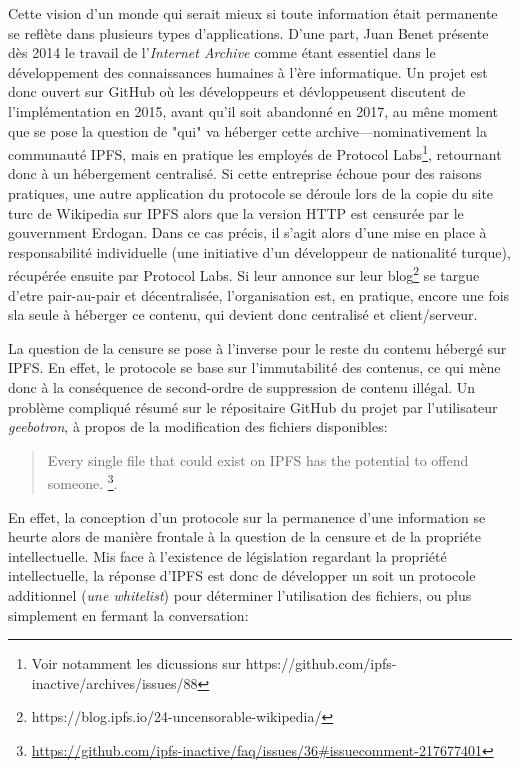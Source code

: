 \documentclass{article}
\begin{document}
Cette vision d'un monde qui serait mieux si toute information était permanente se reflète dans plusieurs types d'applications. D'une part, Juan Benet présente dès 2014 le travail de l'\emph{Internet Archive} comme étant essentiel dans le développement des connaissances humaines à l'ère informatique. Un projet est donc ouvert sur GitHub où les développeurs et dévloppeusent discutent de l'implémentation en 2015, avant qu'il soit abandonné en 2017, au mêne moment que se pose la question de "qui" va héberger cette archive—nominativement la communauté IPFS, mais en pratique les employés de Protocol Labs\footnote{Voir notamment les dicussions sur https://github.com/ipfs-inactive/archives/issues/88}, retournant donc à un hébergement centralisé. Si cette entreprise échoue pour des raisons pratiques, une autre application du protocole se déroule lors de la copie du site turc de Wikipedia sur IPFS alors que la version HTTP est censurée par le gouvernment Erdogan. Dans ce cas précis, il s'agit alors d'une mise en place à responsabilité individuelle (une initiative d'un développeur de nationalité turque), récupérée ensuite par Protocol Labs. Si leur annonce sur leur blog\footnote{https://blog.ipfs.io/24-uncensorable-wikipedia/} se targue d'etre pair-au-pair et décentralisée, l'organisation est, en pratique,  encore une fois sla seule à héberger ce contenu, qui devient donc centralisé et client/serveur.

La question de la censure se pose à l'inverse pour le reste du contenu hébergé sur IPFS. En effet, le protocole se base sur l'immutabilité des contenus, ce qui mène donc à la conséquence de second-ordre de suppression de contenu illégal. Un problème compliqué résumé sur le répositaire GitHub du projet par l'utilisateur \emph{geebotron}, à propos de la modification des fichiers disponibles:

\begin{quote}
    Every single file that could exist on IPFS has the potential to offend someone. \footnote{\url{https://github.com/ipfs-inactive/faq/issues/36\#issuecomment-217677401}}.
\end{quote}

En effet, la conception d'un protocole sur la permanence d'une information se heurte alors de manière frontale à la question de la censure et de la propriéte intellectuelle. Mis face à l'existence de législation regardant la propriété intellectuelle, la réponse d'IPFS est donc de développer un soit un protocole additionnel (\emph{une whitelist}) pour déterminer l'utilisation des fichiers, ou plus simplement en fermant la conversation:
\end{document}
